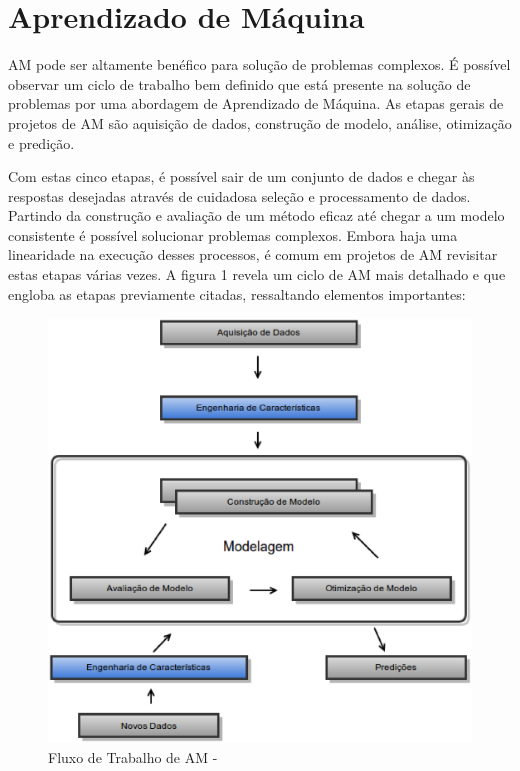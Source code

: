 \chapter{Aprendizado de Máquina}


AM pode ser altamente benéfico para solução de problemas complexos. É possível observar um ciclo de trabalho bem definido que está presente na solução de problemas por uma abordagem de Aprendizado de Máquina. As etapas gerais de projetos de AM são aquisição de dados, construção de modelo, análise, otimização e predição.

Com estas cinco etapas, é possível sair de um conjunto de dados e chegar às respostas desejadas através de cuidadosa seleção e processamento de dados. Partindo da construção e avaliação de um método eficaz até chegar a um modelo consistente é possível solucionar problemas complexos. Embora haja uma linearidade na execução desses processos, é comum em projetos de AM revisitar estas etapas várias vezes. A figura 1 revela um ciclo de AM mais detalhado e que engloba as etapas previamente citadas, ressaltando elementos importantes: 

\begin{figure}[!h]
\centering
\includegraphics[keepaspectratio=true,scale=0.50]
{figuras/workflowml.eps}
\caption{Fluxo de Trabalho de AM - \cite{real2013}}
\label{workflow_am}
\end{figure}

